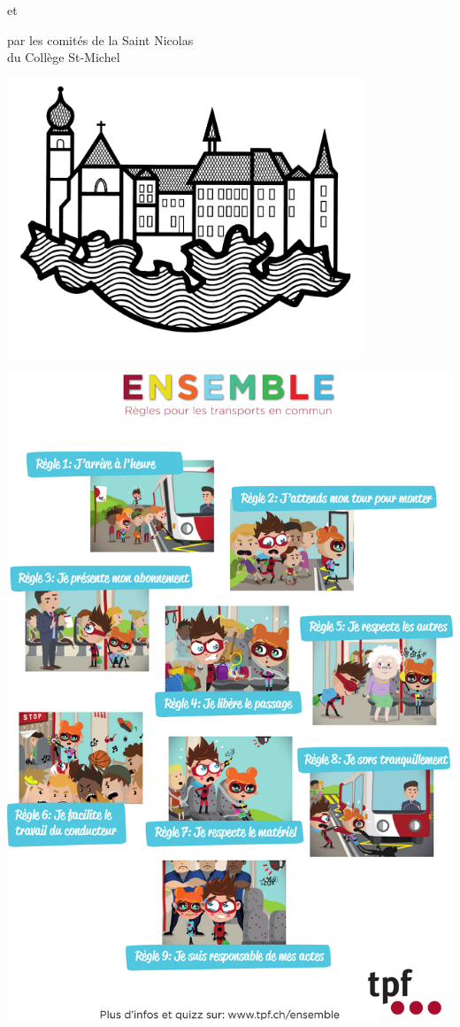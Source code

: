 \vfill
\begin{center}
	{\Huge et}
\end{center}
\vfill

\begin{center}
{\Huge par les comités de la Saint Nicolas\vspace*{1mm}\\
du Collège St-Michel}
\vspace*{5mm}
\par
\includegraphics[width=0.8\textwidth]{csm.jpg}
\end{center}


\clearpage
\thispagestyle{empty}%
{\centering
\includegraphics[width=.96\textwidth]{ensemble.jpg}
\par
}
\clearpage

